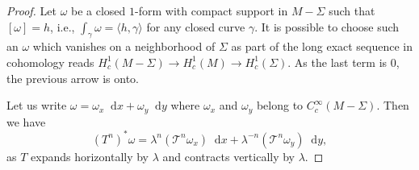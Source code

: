 \documentclass[11pt, a4paper, oneside, final, pagebackref]{amsart}
\newcommand{\boT}{\mathcal{T}}
\newcommand{\dd}{\mathop{}\!\mathrm{d}}
\theoremstyle{definition}
\numberwithin{equation}{section}
\begin{document}
\begin{proof}
Let $\omega$ be a closed $1$-form with compact support in $M-\Sigma$ such
that $[\omega] = h$, i.e., $\int_\gamma \omega = \langle h, \gamma \rangle$
for any closed curve $\gamma$. It is possible to choose such an $\omega$
which vanishes on a neighborhood of $\Sigma$ as part of the long exact
sequence in cohomology reads $H^1_c(M-\Sigma) \to H^1_c(M) \to
H^1_c(\Sigma)$. As the last term is $0$, the previous arrow is onto.

Let us write $\omega = \omega_x \dd x + \omega_y \dd y$ where $\omega_x$ and
$\omega_y$ belong to $C^\infty_c(M-\Sigma)$. Then we have
\begin{equation*}
  (T^n)^* \omega = \lambda^n (\boT^n \omega_x) \dd x + \lambda^{-n} (\boT^n \omega_y) \dd y,
\end{equation*}
as $T$ expands horizontally by $\lambda$ and contracts vertically by
$\lambda$.


\end{proof}
\end{document}
